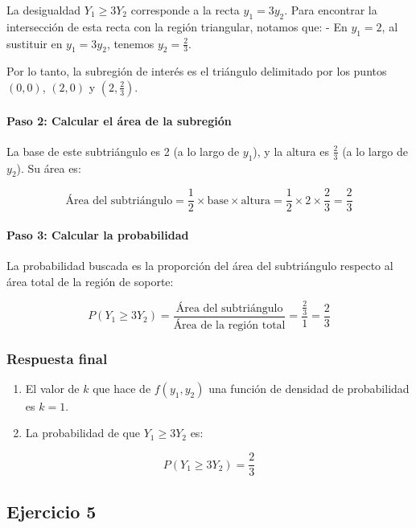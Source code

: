 \documentclass[
]{article}
\providecommand{\tightlist}{%
  \setlength{\itemsep}{0pt}\setlength{\parskip}{0pt}}
\begin{document}
La desigualdad \(Y_{1} \geq 3 Y_{2}\) corresponde a la recta \(y_1 = 3 y_2\). Para encontrar la intersección de esta recta con la región triangular, notamos que:
- En \(y_1 = 2\), al sustituir en \(y_1 = 3 y_2\), tenemos \(y_2 = \frac{2}{3}\).

Por lo tanto, la subregión de interés es el triángulo delimitado por los puntos \((0,0)\), \((2,0)\) y \((2, \frac{2}{3})\).

\paragraph{Paso 2: Calcular el área de la subregión}\label{paso-2-calcular-el-uxe1rea-de-la-subregiuxf3n}

La base de este subtriángulo es 2 (a lo largo de \(y_1\)), y la altura es \(\frac{2}{3}\) (a lo largo de \(y_2\)). Su área es:

\[
\text{Área del subtriángulo} = \frac{1}{2} \times \text{base} \times \text{altura} = \frac{1}{2} \times 2 \times \frac{2}{3} = \frac{2}{3}
\]

\paragraph{Paso 3: Calcular la probabilidad}\label{paso-3-calcular-la-probabilidad}

La probabilidad buscada es la proporción del área del subtriángulo respecto al área total de la región de soporte:

\[
P(Y_{1} \geq 3 Y_{2}) = \frac{\text{Área del subtriángulo}}{\text{Área de la región total}} = \frac{\frac{2}{3}}{1} = \frac{2}{3}
\]

\subsubsection{Respuesta final}\label{respuesta-final}

\begin{enumerate}
\def\labelenumi{\arabic{enumi}.}
\tightlist
\item
  El valor de \(k\) que hace de \(f(y_1, y_2)\) una función de densidad de probabilidad es \(k = 1\).
\item
  La probabilidad de que \(Y_{1} \geq 3 Y_{2}\) es:
\end{enumerate}

\[
P(Y_{1} \geq 3 Y_{2}) = \frac{2}{3}
\]

\subsection{Ejercicio 5}\label{ejercicio-5}
\end{document}
